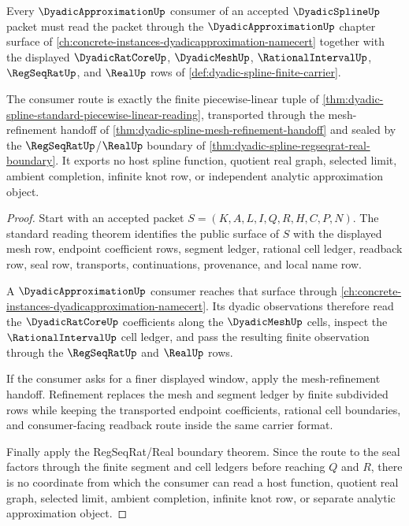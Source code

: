 \begin{theorem}
\label{thm:dyadic-approximation-dyadic-spline-consumer-route}
Every $\DyadicApproximationUp$ consumer of an accepted $\DyadicSplineUp$ packet must read the packet through the $\DyadicApproximationUp$ chapter surface of \autoref{ch:concrete-instances-dyadicapproximation-namecert} together with the displayed $\DyadicRatCoreUp$, $\DyadicMeshUp$, $\RationalIntervalUp$, $\RegSeqRatUp$, and $\RealUp$ rows of \autoref{def:dyadic-spline-finite-carrier}.

The consumer route is exactly the finite piecewise-linear tuple of \autoref{thm:dyadic-spline-standard-piecewise-linear-reading}, transported through the mesh-refinement handoff of \autoref{thm:dyadic-spline-mesh-refinement-handoff} and sealed by the $\RegSeqRatUp$/$\RealUp$ boundary of \autoref{thm:dyadic-spline-regseqrat-real-boundary}. It exports no host spline function, quotient real graph, selected limit, ambient completion, infinite knot row, or independent analytic approximation object.
\end{theorem}
\begin{proof}
Start with an accepted packet $S=(K,A,L,I,Q,R,H,C,P,N)$. The standard reading theorem identifies the public surface of $S$ with the displayed mesh row, endpoint coefficient rows, segment ledger, rational cell ledger, readback row, seal row, transports, continuations, provenance, and local name row.

A $\DyadicApproximationUp$ consumer reaches that surface through \autoref{ch:concrete-instances-dyadicapproximation-namecert}. Its dyadic observations therefore read the $\DyadicRatCoreUp$ coefficients along the $\DyadicMeshUp$ cells, inspect the $\RationalIntervalUp$ cell ledger, and pass the resulting finite observation through the $\RegSeqRatUp$ and $\RealUp$ rows.

If the consumer asks for a finer displayed window, apply the mesh-refinement handoff. Refinement replaces the mesh and segment ledger by finite subdivided rows while keeping the transported endpoint coefficients, rational cell boundaries, and consumer-facing readback route inside the same carrier format.

Finally apply the RegSeqRat/Real boundary theorem. Since the route to the seal factors through the finite segment and cell ledgers before reaching $Q$ and $R$, there is no coordinate from which the consumer can read a host function, quotient real graph, selected limit, ambient completion, infinite knot row, or separate analytic approximation object.
\end{proof}

